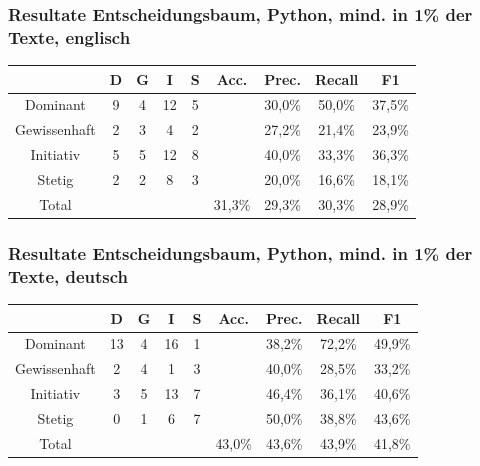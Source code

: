 \documentclass{beamer}
\begin{document}
\begin{frame}
\frametitle{Resultate Entscheidungsbaum, Python, mind. in 1\% der Texte, englisch}
\begin{center}
\begin{tabular}{|c|c|c|c|c|c|c|c|c|}
\hline
 &  D 	& G	& I & S	& Acc.	& Prec. & Recall	& F1\\
\hline
Dominant &     9 & 4 & 12 & 5& &30,0\% & 50,0\% & 37,5\% \\
Gewissenhaft & 2 & 3 & 4 & 2&& 27,2\% & 21,4\% & 23,9\% \\
Initiativ &    5 & 5 & 12 & 8&& 40,0\% & 33,3\% & 36,3\%\\
Stetig &       2 & 2 & 8 & 3&& 20,0\% & 16,6\% & 18,1\% \\
\hline
Total 	&		&		& &	& 31,3\%		& 29,3\% & 30,3\% & 28,9\% \\
\hline
\end{tabular}
\end{center}
\end{frame}
\begin{frame}
\frametitle{Resultate Entscheidungsbaum, Python, mind. in 1\% der Texte, deutsch}
\begin{center}
\begin{tabular}{|c|c|c|c|c|c|c|c|c|}
\hline
 &  D 	& G	& I & S	& Acc.	& Prec. & Recall	& F1\\
\hline
Dominant &     13 & 4 & 16 & 1&&  38,2\% & 72,2\% & 49,9\% \\
Gewissenhaft & 2 & 4 & 1 & 3 &&  40,0\% & 28,5\% & 33,2\%  \\
Initiativ &    3 & 5 & 13 & 7&& 46,4\% & 36,1\% & 40,6\%  \\
Stetig &       0 & 1 & 6 & 7 &&  50,0\% & 38,8\% & 43,6\% \\
\hline
Total 	&		&		& & 		&  43,0\%			&  43,6\% & 43,9\% & 41,8\% \\
\hline
\end{tabular}
\end{center}
\end{frame}
\end{document}
